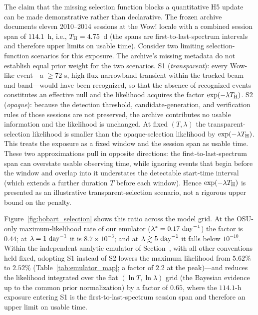 \documentclass[twocolumn]{aastex701}
\begin{document}
The claim that the missing selection function blocks a quantitative H5 update can be made demonstrative rather than declarative. The frozen archive documents eleven 2010--2014 sessions at the Wow! locale with a combined session span of $114.1$~h, i.e., $T_{\rm H}=4.75$~d (the spans are first-to-last-spectrum intervals and therefore upper limits on usable time). Consider two limiting selection-function scenarios for this exposure. The archive's missing metadata do not establish equal prior weight for the two scenarios. S1 ({\em transparent}): every Wow-like event---a $\geq72$-s, high-flux narrowband transient within the tracked beam and band---would have been recognized, so that the absence of recognized events constitutes an effective null and the likelihood acquires the factor $\exp(-\lambda T_{\rm H})$. S2 ({\em opaque}): because the detection threshold, candidate-generation, and verification rules of those sessions are not preserved, the archive contributes no usable information and the likelihood is unchanged. At fixed $(T,\lambda)$ the transparent-selection likelihood is smaller than the opaque-selection likelihood by $\exp(-\lambda T_{\rm H})$. This treats the exposure as a fixed window and the session span as usable time. These two approximations pull in opposite directions: the first-to-last-spectrum span can overstate usable observing time, while ignoring events that begin before the window and overlap into it understates the detectable start-time interval (which extends a further duration $T$ before each window). Hence $\exp(-\lambda T_{\rm H})$ is presented as an illustrative transparent-selection scenario, not a rigorous upper bound on the penalty.

Figure~\ref{fig:hobart_selection} shows this ratio across the model grid. At the OSU-only maximum-likelihood rate of our emulator ($\lambda^\ast=0.17~{\rm day}^{-1}$) the factor is $0.44$; at $\lambda=1~{\rm day}^{-1}$ it is $8.7\times10^{-3}$; and at $\lambda\gtrsim5~{\rm day}^{-1}$ it falls below $10^{-10}$. Within the independent analytic emulator of Section~, with all other conventions held fixed, adopting S1 instead of S2 lowers the maximum likelihood from $5.62\%$ to $2.52\%$ (Table~\ref{tab:emulator_map}; a factor of $2.2$ at the peak)---and reduces the likelihood integrated over the flat $(\ln T,\ln\lambda)$ grid (the Bayesian evidence up to the common prior normalization) by a factor of $0.65$, where the $114.1$-h exposure entering S1 is the first-to-last-spectrum session span and therefore an upper limit on usable time.
\end{document}
